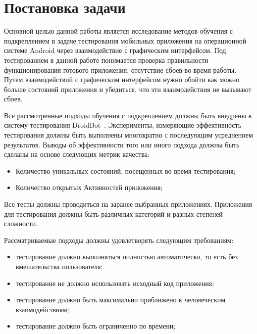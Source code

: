 \section{Постановка задачи}
\label{sec:Chapter1} 

Основной целью данной работы является исследование методов обучения с подкреплением в задаче тестирования мобильных приложения на операционной системе Android через взаимодействие с графическим интерфейсом. Под тестированием в данной работе понимается проверка правильности функционирования готового приложения: отсутствие сбоев во время работы. Путем взаимодействий с графическим интерфейсом нужно обойти как можно больше состояний приложения и убедиться, что эти взаимодействия не вызывают сбоев.

Все рассмотренные подходы обучения с подкреплением должны быть внедрены в систему тестирования DroidBot~\cite{li2017droidbot}. Эксперименты, измеряющие эффективность тестирования должны быть выполнены многократно с последующим усреднением результатов. Выводы об эффективности того или иного подхода должны быть сделаны на основе следующих метрик качества:

\begin{itemize}

\item Количество уникальных состояний, посещенных во время тестирования;

\item Количество открытых Активностей приложения;

\end{itemize}

Все тесты должны проводиться на заранее выбранных приложениях. Приложения для тестирования должны быть различных категорий и разных степеней сложности.

Рассматриваемые подходы должны удовлетворять следующим требованиям:

\begin{itemize}

\item тестирование должно выполняться полностью автоматически, то есть без вмешательства пользователя;

\item тестирование не должно использовать исходный код приложения;

\item тестирование должно быть максимально приближено к человеческим взаимодействиям;

\item тестирование должно быть ограниченно по времени;

\end{itemize}

